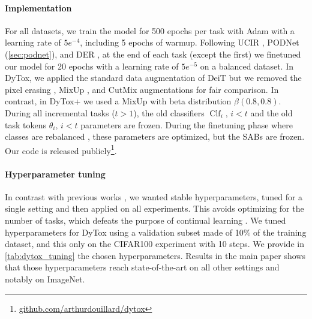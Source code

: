 \paragraph{Implementation} For all datasets, we train the model for 500 epochs per task with Adam
\citep{kingma2014adam} with a learning rate of $5e^{-4}$, including 5 epochs of warmup. Following
UCIR \citep{hou2019ucir}, PODNet (\autoref{sec:podnet}), and DER \citep{yan2021der}, at the end of
each task (except the first) we finetuned our model for 20 epochs with a learning rate of $5e^{-5}$
on a balanced dataset. In DyTox, we applied the standard data augmentation of DeiT
\citep{touvron2021deit} but we removed the pixel erasing \citep{zhong2017erasing}, MixUp
\citep{hingyi2018mixup}, and CutMix \citep{yun2019cutmix} augmentations for fair comparison. In
contrast, in DyTox+ we used a MixUp \citep{hingyi2018mixup} with beta distribution $\beta(0.8,
    0.8)$. During all incremental tasks ($t>1$), the old classifiers $\operatorname{Clf}_i,\, i < t$ and
the old task tokens $\theta_i,\, i < t$ parameters are frozen. During the finetuning phase where
classes are rebalanced \citep{castro2018end_to_end_inc_learn,hou2019ucir,yan2021der}, these
parameters are optimized, but the SABs are frozen. Our code is released
publicly\footnote{\href{https://github.com/arthurdouillard/dytox}{\scriptsize{github.com/arthurdouillard/dytox}}}.


\paragraph{Hyperparameter tuning} In contrast with previous works \citep{yan2021der}, we wanted
stable hyperparameters, tuned for a single setting and then applied on all experiments. This avoids
optimizing for the number of tasks, which defeats the purpose of continual learning
\citep{farquhar2018robustcontinual}. We tuned hyperparameters for DyTox using a validation subset
made of 10\% of the training dataset, and this only on the CIFAR100 experiment with 10 steps. We
provide in \autoref{tab:dytox_tuning} the chosen hyperparameters. Results in the main paper shows
that those hyperparameters reach state-of-the-art on all other settings and notably on ImageNet.



